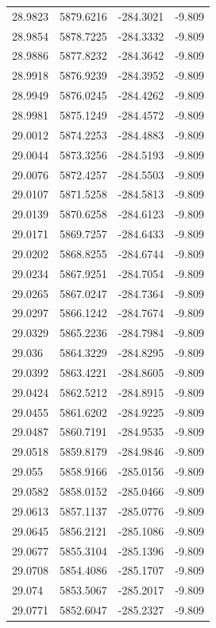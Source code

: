 \begin{table}[H]
\begin{tabular}{llll}
28.9823 & 5879.6216 & -284.3021 & -9.809 \\
28.9854 & 5878.7225 & -284.3332 & -9.809 \\
28.9886 & 5877.8232 & -284.3642 & -9.809 \\
28.9918 & 5876.9239 & -284.3952 & -9.809 \\
28.9949 & 5876.0245 & -284.4262 & -9.809 \\
28.9981 & 5875.1249 & -284.4572 & -9.809 \\
29.0012 & 5874.2253 & -284.4883 & -9.809 \\
29.0044 & 5873.3256 & -284.5193 & -9.809 \\
29.0076 & 5872.4257 & -284.5503 & -9.809 \\
29.0107 & 5871.5258 & -284.5813 & -9.809 \\
29.0139 & 5870.6258 & -284.6123 & -9.809 \\
29.0171 & 5869.7257 & -284.6433 & -9.809 \\
29.0202 & 5868.8255 & -284.6744 & -9.809 \\
29.0234 & 5867.9251 & -284.7054 & -9.809 \\
29.0265 & 5867.0247 & -284.7364 & -9.809 \\
29.0297 & 5866.1242 & -284.7674 & -9.809 \\
29.0329 & 5865.2236 & -284.7984 & -9.809 \\
29.036 & 5864.3229 & -284.8295 & -9.809 \\
29.0392 & 5863.4221 & -284.8605 & -9.809 \\
29.0424 & 5862.5212 & -284.8915 & -9.809 \\
29.0455 & 5861.6202 & -284.9225 & -9.809 \\
29.0487 & 5860.7191 & -284.9535 & -9.809 \\
29.0518 & 5859.8179 & -284.9846 & -9.809 \\
29.055 & 5858.9166 & -285.0156 & -9.809 \\
29.0582 & 5858.0152 & -285.0466 & -9.809 \\
29.0613 & 5857.1137 & -285.0776 & -9.809 \\
29.0645 & 5856.2121 & -285.1086 & -9.809 \\
29.0677 & 5855.3104 & -285.1396 & -9.809 \\
29.0708 & 5854.4086 & -285.1707 & -9.809 \\
29.074 & 5853.5067 & -285.2017 & -9.809 \\
29.0771 & 5852.6047 & -285.2327 & -9.809 \\

\end{tabular}
\end{table}
